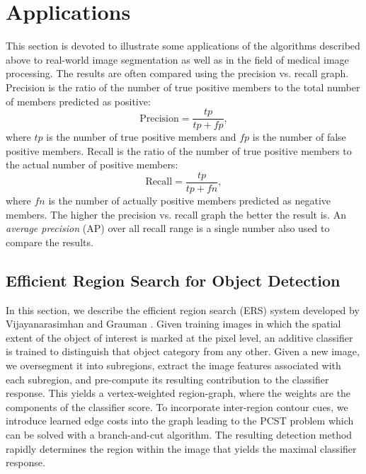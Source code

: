 \documentclass{SMBV12}
\begin{document}
\section{Applications}
\label{sec:applications}
This section is devoted to illustrate some applications of the algorithms described above to real-world image segmentation as well as in the field of medical image processing. The results are often compared using the precision vs. recall graph. Precision is the ratio of the number of true positive members to the total number of members predicted as positive:
\begin{equation}
\mathrm{Precision} = \dfrac{tp}{tp + fp},
\end{equation}
where $tp$ is the number of true positive members and $fp$ is the number of false positive members. Recall is the ratio of the number of true positive members to the actual number of positive members:
\begin{equation}
\mathrm{Recall} = \dfrac{tp}{tp + fn},
\end{equation}
where $fn$ is the number of actually positive members predicted as negative members. The higher the precision vs. recall graph the better the result is. An \emph{average precision} (AP) over all recall range is a single number also used to compare the results.

\subsection{Efficient Region Search for Object Detection}

In this section, we describe the efficient region search (ERS) system developed by Vijayanarasimhan and Grauman \cite{VijayGrauman2011}. Given training images in which the spatial extent of the object of interest is marked at the pixel level, an additive classifier is trained to distinguish that object category from any other. Given a new image, we oversegment it into subregions, extract the image features associated with each subregion, and pre-compute its resulting contribution to the classifier response. This yields a vertex-weighted region-graph, where the weights are the components of the classifier score. To incorporate inter-region contour cues, we introduce learned edge costs into the graph leading to the PCST problem which can be solved with a branch-and-cut algorithm. The resulting detection method rapidly determines the region within the image that yields the maximal classifier response.
\end{document}

